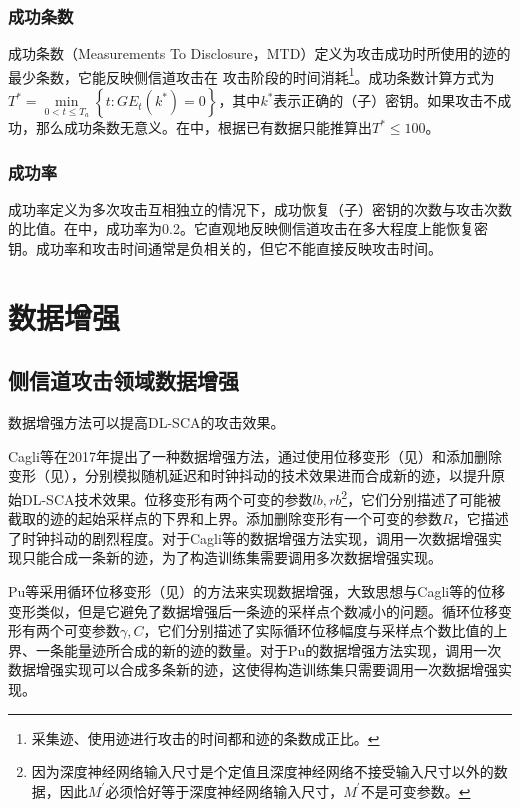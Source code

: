 {	\subsubsection{成功条数}
	成功条数\citep{Kim14}（Measurements To Disclosure，MTD）定义为攻击成功时所使用的迹的最少条数，它能反映侧信道攻击在
	攻击阶段的时间消耗\footnote{采集迹、使用迹进行攻击的时间都和迹的条数成正比。}。成功条数计算方式为$T^*=\min\limits_{0<t\le T_a}\left\lbrace t:GE_t(k^*)=0 \right\rbrace $，其中$k^*$表示正确的（子）密钥。如果攻击不成功，那么成功条数无意义。在中，根据已有数据只能推算出$T^*\le100$。
	\subsubsection{成功率}
	成功率定义为多次攻击互相独立的情况下，成功恢复（子）密钥的次数与攻击次数的比值。在中，成功率为0.2。它直观地反映侧信道攻击在多大程度上能恢复密钥。成功率和攻击时间通常是负相关的，但它不能直接反映攻击时间。
	\section{数据增强}
	
	\subsection{侧信道攻击领域数据增强}
	数据增强方法可以提高DL-SCA的攻击效果。
	
	Cagli等\citep{Cagli17}在2017年提出了一种数据增强方法，通过使用位移变形（见）和添加删除变形（见），分别模拟随机延迟和时钟抖动的技术效果进而合成新的迹，以提升原始DL-SCA技术效果。位移变形有两个可变的参数$lb,rb$\footnote{因为深度神经网络输入尺寸是个定值且深度神经网络不接受输入尺寸以外的数据，因此$M^\prime$必须恰好等于深度神经网络输入尺寸，$M^\prime$不是可变参数。}，它们分别描述了可能被截取的迹的起始采样点的下界和上界。添加删除变形有一个可变的参数$R$，它描述了时钟抖动的剧烈程度。对于Cagli等的数据增强方法实现，调用一次数据增强实现只能合成一条新的迹，为了构造训练集需要调用多次数据增强实现。
	
	Pu等\citep{Pu17}采用循环位移变形（见）的方法来实现数据增强，大致思想与Cagli等\citep{Cagli17}的位移变形类似，但是它避免了数据增强后一条迹的采样点个数减小的问题。循环位移变形有两个可变参数$\gamma,C$，它们分别描述了实际循环位移幅度与采样点个数比值的上界、一条能量迹所合成的新的迹的数量。对于Pu的数据增强方法实现，调用一次数据增强实现可以合成多条新的迹，这使得构造训练集只需要调用一次数据增强实现。
	
}
